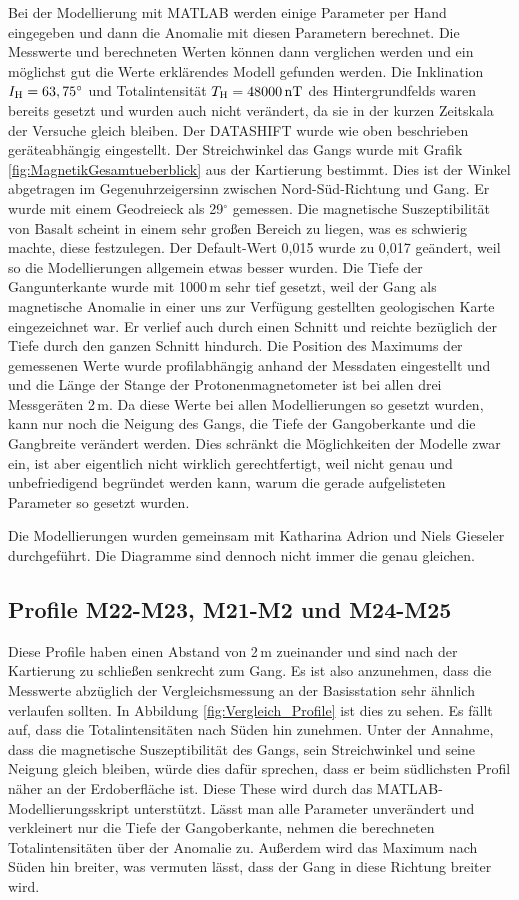 Bei der Modellierung mit MATLAB werden einige Parameter per Hand eingegeben und dann die Anomalie mit diesen Parametern berechnet. Die Messwerte und berechneten Werten können dann verglichen werden und ein möglichst gut die Werte erklärendes Modell gefunden werden. Die Inklination $I_{\mathrm{H}}=63,75^\circ$ und Totalintensität $T_{\mathrm{H}}=48000\,\mathrm{nT}$ des Hintergrundfelds waren bereits gesetzt und wurden auch nicht verändert, da sie in der kurzen Zeitskala der Versuche gleich bleiben. Der DATASHIFT wurde wie oben beschrieben geräteabhängig eingestellt. Der Streichwinkel das Gangs wurde mit Grafik \ref{fig:MagnetikGesamtueberblick} aus der Kartierung bestimmt. Dies ist der Winkel abgetragen im Gegenuhrzeigersinn zwischen Nord-Süd-Richtung und Gang. Er wurde mit einem Geodreieck als 29$^\circ$ gemessen. Die magnetische Suszeptibilität von Basalt scheint in einem sehr großen Bereich zu liegen, was es schwierig machte, diese festzulegen. Der Default-Wert 0,015 wurde zu 0,017 geändert, weil so die Modellierungen allgemein etwas besser wurden. Die Tiefe der Gangunterkante wurde mit 1000\,m sehr tief gesetzt, weil der Gang als magnetische Anomalie in einer uns zur Verfügung gestellten geologischen Karte eingezeichnet war. Er verlief auch durch einen Schnitt und reichte bezüglich der Tiefe durch den ganzen Schnitt hindurch. Die Position des Maximums der gemessenen Werte wurde profilabhängig anhand der Messdaten eingestellt und und die Länge der Stange der Protonenmagnetometer ist bei allen drei Messgeräten 2\,m. Da diese Werte bei allen Modellierungen so gesetzt wurden, kann nur noch die Neigung des Gangs, die Tiefe der Gangoberkante und die Gangbreite verändert werden.
Dies schränkt die Möglichkeiten der Modelle zwar ein, ist aber eigentlich nicht wirklich gerechtfertigt, weil nicht genau und unbefriedigend begründet werden kann, warum die gerade aufgelisteten Parameter so gesetzt wurden.

Die Modellierungen wurden gemeinsam mit Katharina Adrion und Niels Gieseler durchgeführt. Die Diagramme sind dennoch nicht immer die genau gleichen.

\subsection{Profile M22-M23, M21-M2 und M24-M25}

Diese Profile haben einen Abstand von 2\,m zueinander und sind nach der Kartierung zu schließen senkrecht zum Gang. Es ist also anzunehmen, dass die Messwerte abzüglich der Vergleichsmessung an der Basisstation sehr ähnlich verlaufen sollten. In Abbildung \ref{fig:Vergleich_Profile} ist dies zu sehen. Es fällt auf, dass die Totalintensitäten nach Süden hin zunehmen. Unter der Annahme, dass die magnetische Suszeptibilität des Gangs, sein Streichwinkel und seine Neigung gleich bleiben, würde dies dafür sprechen, dass er beim südlichsten Profil näher an der Erdoberfläche ist. Diese These wird durch das MATLAB-Modellierungsskript unterstützt. Lässt man alle Parameter unverändert und verkleinert nur die Tiefe der Gangoberkante, nehmen die berechneten Totalintensitäten über der Anomalie zu. Außerdem wird das Maximum nach Süden hin breiter, was vermuten lässt, dass der Gang in diese Richtung breiter wird.


